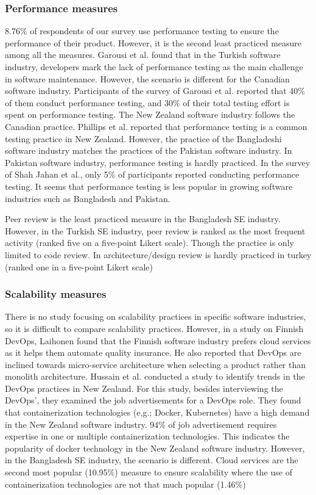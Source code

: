 \subsubsection{Performance measures}
\label{performance_comparison}
8.76\% of respondents of our survey use performance testing to ensure the performance of their product. However, it is the second least practiced measure among all the measures. Garousi et al.\cite{Garousi2015} found that in the Turkish software industry, developers mark the lack of performance testing as the main challenge in software maintenance. However, the scenario is different for the Canadian software industry. Participants of the survey of Garousi et al.\cite{Garousi2013} reported that 40\% of them conduct performance testing, and 30\% of their total testing effort is spent on performance testing. The New Zealand software industry follows the Canadian practice. Phillips et al.\cite{Phillips2003} reported that performance testing is a common testing practice in New Zealand. However, the practice of the Bangladeshi software industry matches the practices of the Pakistan software industry. In Pakistan software industry, performance testing is hardly practiced. In the survey of Shah Jahan et al.\cite{Jahan2019}, only 5\% of participants reported conducting performance testing. It seems that performance testing is less popular in growing software industries such as Bangladesh and Pakistan.

Peer review is the least practiced measure in the Bangladesh SE industry. However, in the Turkish SE industry, peer review is ranked as the most frequent activity\cite{Garousi2015} (ranked five on a five-point Likert scale). Though the practice is only limited to code review. In architecture/design review is  hardly practiced in turkey (ranked one in a five-point Likert scale)

\subsubsection{Scalability measures}
\label{scalability_comparison}
There is no study focusing on scalability practices in specific software industries, so it is difficult to compare scalability practices. However, in a study on Finnish DevOps, Laihonen\cite{Laihonen2018} found that the Finnish software industry prefers cloud services as it helps them automate quality insurance. He also reported that DevOps are inclined towards micro-service architecture when selecting a product rather than monolith architecture. Hussain et al.\cite{Hussain2017} conducted a study to identify trends in the DevOps practices in New Zealand. For this study, besides interviewing the DevOps', they examined the job advertisements for a DevOps role. They found that containerization technologies (e,g.; Docker, Kubernetes) have a high demand in the New Zealand software industry. 94\% of job advertisement requires expertise in one or multiple containerization technologies. This indicates the popularity of docker technology in the New Zealand software industry. However, in the Bangladesh SE industry, the scenario is different. Cloud services are the second most popular (10.95\%)  measure to ensure scalability where the use of containerization technologies are not that much popular (1.46\%)